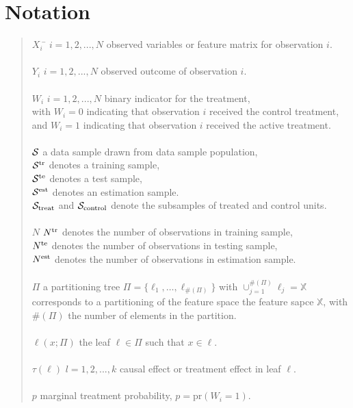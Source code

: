 \documentclass[11pt]{article}
\newcommand{\est}{{\rm est}}
\newcommand{\calp}{{\Pi}}
\newcommand{\cals}{{\cal S}}
\newcommand{\train}{{\rm tr}}
\newcommand{\test}{{\rm te}}
\begin{document}
\section{Notation}
\begin{quote}
\begin{tabbing}
$X_i$ \qquad\qquad \= $i = 1, 2,..., N$ \qquad observed variables or feature matrix for observation $i$.\\
\\
$Y_i$ \> $i = 1, 2, ..., N$ \qquad observed outcome of observation $i$.\\
\\
$W_i$ \>$i = 1, 2, ..., N$ \qquad binary indicator for the treatment,\\
\>with $W_i = 0$ indicating that observation $i$ received the control treatment, \\
\>and $W_i = 1$ indicating that observation $i$ received the active treatment.\\
\\
$\cals$ \> a data sample drawn from data sample population, \\
\> $\cals^{\text{tr}}$ denotes a training sample,\\
\> $\cals^{\text{te}}$ denotes a test sample, \\
\> $\cals^{\text{est}}$ denotes an estimation sample.\\
\> $\cals_{\text{treat}}$ and $\cals_{\text{control}}$ denote the subsamples of treated and control units.\\
\\
$N$ 
\> $N^\train$ denotes the number of observations in training sample,\\
\> $N^\test$ denotes the number of observations in testing sample,\\
\> $N^\est$ denotes the number of observations in estimation sample.\\
\\
$\Pi$ \>  a partitioning tree $\calp=\{\ell_1,\ldots,\ell_{\#(\Pi)}\}$ with $\cup_{j=1}^{\#(\calp)} \ell_j=\mathbb{X}$ \\ 
\> corresponds to a partitioning of the feature space the feature sapce $\mathbb{X}$, with\\
\> $\#(\calp)$ the number of elements in the partition.\\
\\
$\ell(x; \calp)$ \> the leaf $\ell \in \calp$ such that $x \in \ell$.\\
\\

$\tau(\ell)$ \> $l = 1, 2, ..., k$ \qquad causal effect or treatment effect in leaf $\ell$. \\
\\
$p$ \> marginal treatment probability, $p = \text{pr}(W_i = 1)$. 

\end{tabbing}
\end{quote}
\end{document}
